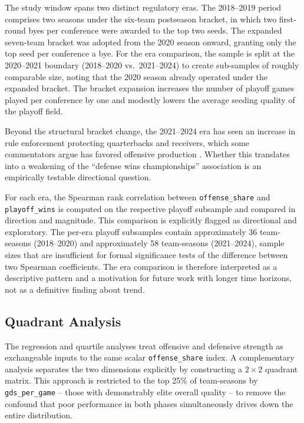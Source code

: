 The study window spans two distinct regulatory eras. The 2018--2019 period
comprises two seasons under the six-team postseason bracket, in which two
first-round byes per conference were awarded to the top two seeds. The
expanded seven-team bracket was adopted from the 2020 season onward, granting
only the top seed per conference a bye. For the era comparison, the sample is
split at the 2020--2021 boundary (2018--2020 vs.\ 2021--2024) to create
sub-samples of roughly comparable size, noting that the 2020 season already
operated under the expanded bracket. The bracket expansion increases the
number of playoff games played per conference by one and modestly lowers the
average seeding quality of the playoff field.

Beyond the structural bracket change, the 2021--2024 era has seen an increase
in rule enforcement protecting quarterbacks and receivers, which some
commentators argue has favored offensive production \parencite{barnwell2019passingrevolution,nflscoring2023trends}. Whether this translates
into a weakening of the ``defense wins championships'' association is an
empirically testable directional question.

For each era, the Spearman rank correlation between \texttt{offense\_share} and
\texttt{playoff\_wins} is computed on the respective playoff subsample and
compared in direction and magnitude. This comparison is explicitly flagged as
directional and exploratory. The per-era playoff subsamples contain
approximately 36 team-seasons (2018--2020) and approximately 58 team-seasons
(2021--2024), sample sizes that are insufficient for formal significance tests
of the difference between two Spearman coefficients. The era comparison is
therefore interpreted as a descriptive pattern and a motivation for future
work with longer time horizons, not as a definitive finding about trend.

\subsection{Quadrant Analysis}
\label{sec:quadrant-analysis}

The regression and quartile analyses treat offensive and defensive strength as
exchangeable inputs to the same scalar \texttt{offense\_share} index. A
complementary analysis separates the two dimensions explicitly by constructing
a $2 \times 2$ quadrant matrix. This approach is restricted to the top 25\%
of team-seasons by \texttt{gds\_per\_game} -- those with demonstrably elite
overall quality -- to remove the confound that poor performance in both phases
simultaneously drives down the entire distribution.

